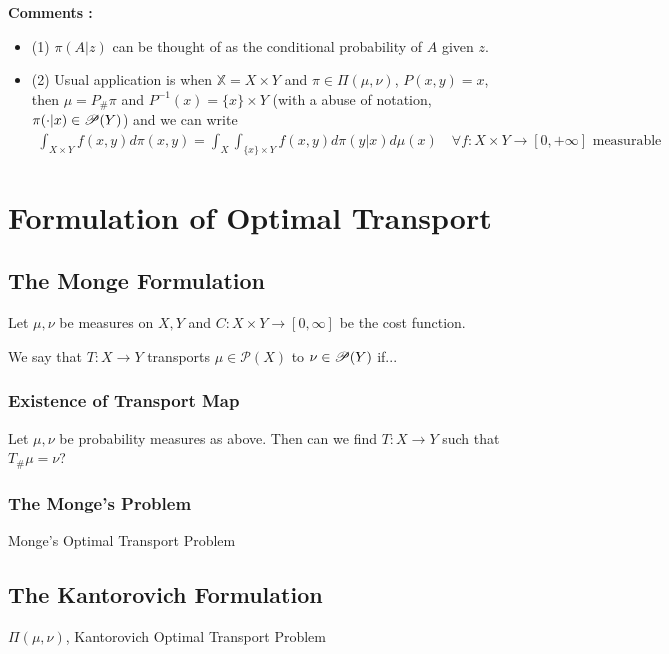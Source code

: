 \documentclass[10pt,a4paper]{article}
\renewenvironment{i}
{\begin{itemize} 
	}%
	{\end{itemize}
}
\begin{document}
\textbf{Comments :}
\begin{i}
\item[(1)] $\pi(A|z)$ can be thought of as the conditional probability of $A$ given $z$.
\item[(2)] Usual application is when $\mathbb{X} = X\times Y$ and $\pi \in \Pi(\mu, \nu)$, $P(x,y) = x$, then $\mu = P_{\#}\pi$ and $P^{-1}(x) = \{x\} \times Y$ (with a abuse of notation, $\pi(\cdot |x) \in \mathscr{P}(Y)$) and we can write
\begin{align*}
\int_{X\times Y} f(x,y) d\pi(x,y) = \int_X \int_{\{x\}\times Y} f(x,y) d\pi(y|x) d\mu(x) \quad \forall f: X\times Y \rightarrow [0, +\infty] \text{ measurable}
\end{align*}
\end{i}
\s

\section{Formulation of Optimal Transport}

\subsection{The Monge Formulation} 

Let $\mu, \nu$ be measures on $X, Y$ and $C : X\times Y \rightarrow [0, \infty]$ be the cost function.
\s

 We say that $T: X\rightarrow Y$ transports $\mu \in \mathscr{P}(X)$ to $\nu \in \mathscr{P}(Y)$ if...
\s

\subsubsection*{Existence of Transport Map}
Let $\mu, \nu$ be probability measures as above. Then can we find $T : X\rightarrow Y$ such that $T_{\#} \mu =\nu$?
\s

\subsubsection*{The Monge's Problem}

 Monge's Optimal Transport Problem
\s

\subsection{The Kantorovich Formulation}

 $\Pi(\mu,\nu)$, Kantorovich Optimal Transport Problem
\s
\end{document}
